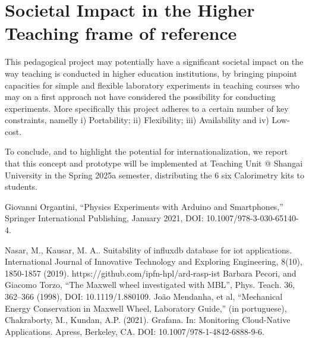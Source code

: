 \documentclass[conference]{IEEEtran}
\begin{document}
\section{Societal Impact in the Higher Teaching frame of reference}
This pedagogical project may potentially have a significant societal impact on the way teaching is conducted in higher education institutions, 
by bringing pinpoint capacities for simple and flexible laboratory experiments in 
teaching courses who may on a first approach not have considered the possibility for conducting experiments.
More specifically this project adheres to a certain number of key constraints, namelly i)  Portability; ii) Flexibility; iii) Availability and iv) Low-cost.

To conclude, and to highlight the potential for internationalization, we report that 
this concept and prototype will be implemented at Teaching Unit @ Shangai University in the Spring 2025a semester, distributing the 6 six Calorimetry kits to students.

\begin{thebibliography}{00}
Giovanni Organtini, ``Physics Experiments with Arduino and Smartphones,''
Springer International Publishing, January 2021, DOI: 10.1007/978-3-030-65140-4.

 Nasar, M., Kausar, M. A.. Suitability of influxdb database for iot applications. International Journal of Innovative Technology and Exploring Engineering, 8(10), 1850-1857  (2019).
 https://github.com/ipfn-hpl/ard-rasp-ist
 Barbara Pecori, and Giacomo Torzo,  ``The Maxwell wheel investigated with MBL'', Phys. Teach. 36, 362–366 (1998), DOI: 10.1119/1.880109.
João Mendanha, et al, ``Mechanical Energy Conservation in Maxwell Wheel, Laboratory Guide,'' (in portuguese),
 Chakraborty, M., Kundan, A.P. (2021). Grafana. In: Monitoring Cloud-Native Applications. Apress, Berkeley, CA. DOI: 10.1007/978-1-4842-6888-9-6.
\end{thebibliography}
\end{document}
